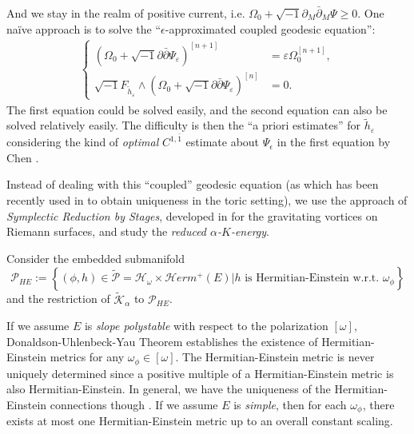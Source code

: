 \documentclass[10pt, letterpaper]{amsart}
\theoremstyle{plain}
\theoremstyle{definition}
\numberwithin{equation}{section}
\begin{document}
And we stay in the realm of positive current, i.e. $\Omega_0+\sqrt{-1}\partial_M\bar\partial_M \Psi\geq 0$. One na\"ive approach is to solve the ``$\epsilon$-approximated coupled geodesic equation'': 
\begin{align}
\left\{
\begin{array}{rl}
\left(\Omega_0+\sqrt{-1}\partial\bar\partial \Psi_\varepsilon\right)^{[n+1]}
& = \varepsilon \Omega_0^{[n+1]}, \\
\sqrt{-1}F_{\widetilde h_\varepsilon}\wedge \left(\Omega_0+\sqrt{-1}\partial\bar\partial \Psi_\varepsilon\right)^{[n]}
& =0.
\end{array}
\right.
\end{align}
The first equation could be solved easily, and the second equation can also be solved relatively easily. The difficulty is then the ``a priori estimates'' for $\widetilde h_\varepsilon$ considering the kind of \emph{optimal} $C^{1,\bar 1}$ estimate about $\Psi_\epsilon$ in the first equation by Chen \cite{XX}.


Instead of dealing with this ``coupled'' geodesic equation (as which has been recently used in \cite{GF-L} to obtain uniqueness in the toric setting), we use the approach of \emph{Symplectic Reduction by Stages}, developed in \cite{AllGV} for the gravitating vortices on Riemann surfaces, and study the \emph{reduced $\alpha$-$K$-energy}. 


Consider the embedded submanifold
\[\mathcal{P}_{HE}:=\left\{ \left(\phi, h\right)\in \widetilde{\mathcal{P}}=\mathcal{H}_\omega\times \mathcal{H}erm^+\left(E\right)| h\text{ is Hermitian-Einstein w.r.t. }\omega_\phi\right\}\]
and the restriction of $\widetilde{\mathcal{K}}_\alpha$ to $\mathcal{P}_{HE}$. 

If we assume $E$ is \emph{slope polystable} with respect to the polarization $[\omega]$, Donaldson-Uhlenbeck-Yau Theorem \cite[Theorem 6.10.19]{Ko} establishes the existence of Hermitian-Einstein metrics for any $\omega_\phi\in \left[\omega\right]$. The Hermitian-Einstein metric is never uniquely determined since a positive multiple of a Hermitian-Einstein metric is also Hermitian-Einstein. In general, we have the uniqueness of the Hermitian-Einstein connections though \cite[Proposition 6.3.37]{Ko}. If we assume $E$ is \emph{simple}, then for each $\omega_\phi$, there exists at most one Hermitian-Einstein metric up to an overall constant scaling. 
\end{document}
